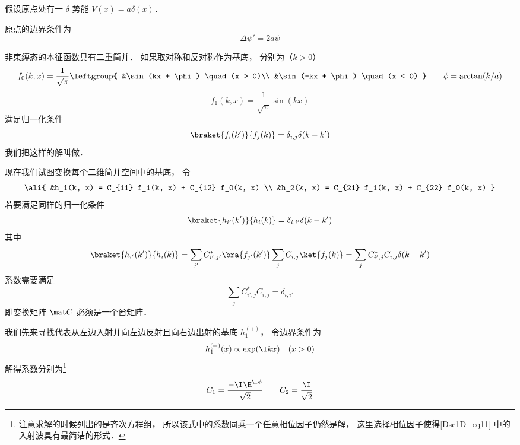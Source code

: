 
假设原点处有一 $\delta$ 势能 $V(x) = a\delta(x)$．

原点的边界条件为
\begin{equation}
\Delta \psi' = 2a \psi
\end{equation}

非束缚态的本征函数具有二重简并． 如果取对称和反对称作为基底， 分别为（$k > 0$）
\begin{equation}
f_0(k, x) = \frac{1}{\sqrt{\pi}}\leftgroup{
&\sin(kx + \phi) \quad (x > 0)\\
&\sin(-kx + \phi) \quad (x < 0)
} \qquad  \phi = \arctan(k/a)
\end{equation}
\begin{equation}
f_1(k, x) = \frac{1}{\sqrt{\pi}}\sin(kx)
\end{equation}
满足归一化条件
\begin{equation}\label{Dsc1D_eq4}
\braket{f_i(k')}{f_j(k)} = \delta_{i,j} \delta(k - k')
\end{equation}
我们把这样的解叫做．

现在我们试图变换每个二维简并空间中的基底， 令
\begin{equation}\ali{
&h_1(k, x) =  C_{11} f_1(k, x) + C_{12} f_0(k, x) \\
&h_2(k, x) =  C_{21} f_1(k, x) + C_{22} f_0(k, x)
}\end{equation}
若要满足同样的归一化条件
\begin{equation}\label{Dsc1D_eq6}
\braket{h_{i'}(k')}{h_i(k)} = \delta_{i,i'}\delta(k - k')
\end{equation}
其中
\begin{equation}
\braket{h_{i'}(k')}{h_i(k)} = \sum_{j'} C_{i',j'}^* \bra{f_{j'}(k')} \sum_j C_{i, j} \ket{f_j(k)} = \sum_j C_{i', j}^* C_{i, j} \delta(k - k')
\end{equation}
系数需要满足
\begin{equation}
 \sum_j C_{i', j}^* C_{i, j} = \delta_{i, i'}
\end{equation}
即变换矩阵 $\mat C$ 必须是一个酋矩阵．

我们先来寻找代表从左边入射并向左边反射且向右边出射的基底 $h_1^{(+)}$， 令边界条件为
\begin{equation}
h_1^{(+)}(x) \propto \exp(\I k x) \quad (x > 0)
\end{equation}
解得系数分别为\footnote{注意求解的时候列出的是齐次方程组， 所以该式中的系数同乘一个任意相位因子仍然是解， 这里选择相位因子使得\autoref{Dsc1D_eq11} 中的入射波具有最简洁的形式．}
\begin{equation}
C_1 = \frac{-\I\E^{\I \phi}}{\sqrt{2}} \qquad
C_2 =  \frac{\I}{\sqrt{2}}
\end{equation}


